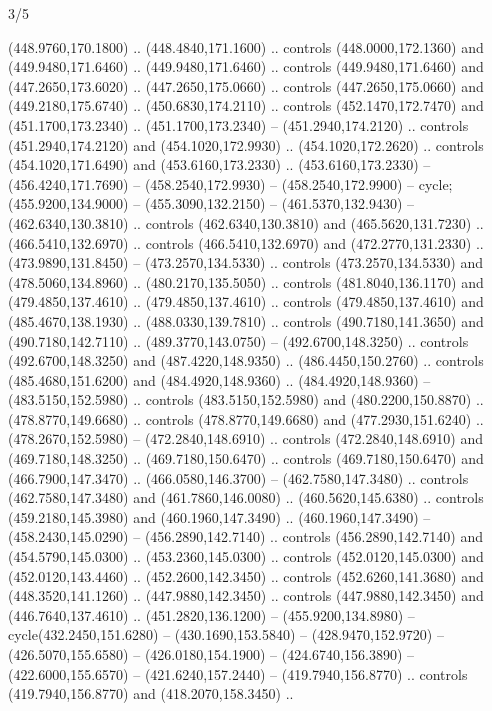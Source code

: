 \begin{flagdescription}{3/5}
\begin{scope}[shift={(0.5\flaglength,0.5\flagwidth)},scale=\flagwidth/510]
\begin{scope}[y=0.80pt, x=0.80pt, yscale=-1.06, xscale=1.06,yshift=-240pt,xshift=-400pt]
\begin{scope}[cm={{0.83333,0.0,0.0,0.83333,(154.64672,48.64761)}}]
\begin{scope}[cm={{0.93334,0.0,0.0,0.93334,(-4.86471,22.64035)}}]
\begin{scope}[line width=0.489\lw]
\begin{scope}[draw=c003300,fill=c338a00]
  (448.9760,170.1800) .. (448.4840,171.1600) .. controls (448.0000,172.1360) and
  (449.9480,171.6460) .. (449.9480,171.6460) .. controls (449.9480,171.6460) and
  (447.2650,173.6020) .. (447.2650,175.0660) .. controls (447.2650,175.0660) and
  (449.2180,175.6740) .. (450.6830,174.2110) .. controls (452.1470,172.7470) and
  (451.1700,173.2340) .. (451.1700,173.2340) -- (451.2940,174.2120) .. controls
  (451.2940,174.2120) and (454.1020,172.9930) .. (454.1020,172.2620) .. controls
  (454.1020,171.6490) and (453.6160,173.2330) .. (453.6160,173.2330) --
  (456.4240,171.7690) -- (458.2540,172.9930) -- (458.2540,172.9900) -- cycle;
 (455.9200,134.9000) -- (455.3090,132.2150) --
  (461.5370,132.9430) -- (462.6340,130.3810) .. controls (462.6340,130.3810) and
  (465.5620,131.7230) .. (466.5410,132.6970) .. controls (466.5410,132.6970) and
  (472.2770,131.2330) .. (473.9890,131.8450) -- (473.2570,134.5330) .. controls
  (473.2570,134.5330) and (478.5060,134.8960) .. (480.2170,135.5050) .. controls
  (481.8040,136.1170) and (479.4850,137.4610) .. (479.4850,137.4610) .. controls
  (479.4850,137.4610) and (485.4670,138.1930) .. (488.0330,139.7810) .. controls
  (490.7180,141.3650) and (490.7180,142.7110) .. (489.3770,143.0750) --
  (492.6700,148.3250) .. controls (492.6700,148.3250) and (487.4220,148.9350) ..
  (486.4450,150.2760) .. controls (485.4680,151.6200) and (484.4920,148.9360) ..
  (484.4920,148.9360) -- (483.5150,152.5980) .. controls (483.5150,152.5980) and
  (480.2200,150.8870) .. (478.8770,149.6680) .. controls (478.8770,149.6680) and
  (477.2930,151.6240) .. (478.2670,152.5980) -- (472.2840,148.6910) .. controls
  (472.2840,148.6910) and (469.7180,148.3250) .. (469.7180,150.6470) .. controls
  (469.7180,150.6470) and (466.7900,147.3470) .. (466.0580,146.3700) --
  (462.7580,147.3480) .. controls (462.7580,147.3480) and (461.7860,146.0080) ..
  (460.5620,145.6380) .. controls (459.2180,145.3980) and (460.1960,147.3490) ..
  (460.1960,147.3490) -- (458.2430,145.0290) -- (456.2890,142.7140) .. controls
  (456.2890,142.7140) and (454.5790,145.0300) .. (453.2360,145.0300) .. controls
  (452.0120,145.0300) and (452.0120,143.4460) .. (452.2600,142.3450) .. controls
  (452.6260,141.3680) and (448.3520,141.1260) .. (447.9880,142.3450) .. controls
  (447.9880,142.3450) and (446.7640,137.4610) .. (451.2820,136.1200) --
  (455.9200,134.8980) -- cycle(432.2450,151.6280) -- (430.1690,153.5840) --
  (428.9470,152.9720) -- (426.5070,155.6580) -- (426.0180,154.1900) --
  (424.6740,156.3890) -- (422.6000,155.6570) -- (421.6240,157.2440) --
  (419.7940,156.8770) .. controls (419.7940,156.8770) and (418.2070,158.3450) ..

\end{scope}
\end{scope}
\end{scope}
\end{scope}
\end{scope}
\end{scope}
\end{flagdescription}
